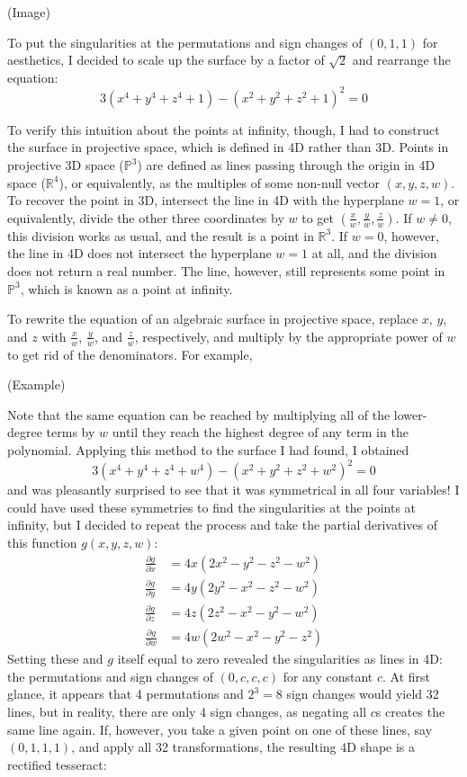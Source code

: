 \documentclass{article}
\begin{document}
(Image)

To put the singularities at the permutations and sign changes of $(0, 1, 1)$ for aesthetics,
I decided to scale up the surface by a factor of $\sqrt{2}$
and rearrange the equation:
$$3(x^4+y^4+z^4+1)-(x^2+y^2+z^2+1)^2=0$$

To verify this intuition about the points at infinity, though,
I had to construct the surface in projective space,
which is defined in 4D rather than 3D.
Points in projective 3D space ($\mathbb{P}^3$)
are defined as lines passing through the origin in 4D space ($\mathbb{R}^4$),
or equivalently, as the multiples of some non-null vector $(x, y, z, w)$.
To recover the point in 3D, intersect the line in 4D with the hyperplane $w=1$,
or equivalently, divide the other three coordinates by $w$
to get $\left(\frac{x}{w}, \frac{y}{w}, \frac{z}{w}\right)$.
If $w\neq0$, this division works as usual, and the result is a point in $\mathbb{R}^3$.
If $w=0$, however, the line in 4D does not intersect the hyperplane $w=1$ at all,
and the division does not return a real number.
The line, however, still represents some point in $\mathbb{P}^3$,
which is known as a point at infinity.

To rewrite the equation of an algebraic surface in projective space,
replace $x$, $y$, and $z$ with $\frac{x}{w}$, $\frac{y}{w}$, and $\frac{z}{w}$, respectively,
and multiply by the appropriate power of $w$ to get rid of the denominators.
For example,

(Example)

Note that the same equation can be reached by multiplying all of the lower-degree terms by $w$
until they reach the highest degree of any term in the polynomial.
Applying this method to the surface I had found, I obtained
$$3(x^4+y^4+z^4+w^4)-(x^2+y^2+z^2+w^2)^2=0$$
and was pleasantly surprised to see that it was symmetrical in all four variables!
I could have used these symmetries to find the singularities at the points at infinity,
but I decided to repeat the process
and take the partial derivatives of this function $g(x, y, z, w)$:
\begin{align*}
  \frac{\partial g}{\partial x} &= 4x(2x^2-y^2-z^2-w^2) \\ 
  \frac{\partial g}{\partial y} &= 4y(2y^2-x^2-z^2-w^2) \\ 
  \frac{\partial g}{\partial z} &= 4z(2z^2-x^2-y^2-w^2) \\ 
  \frac{\partial g}{\partial w} &= 4w(2w^2-x^2-y^2-z^2) 
\end{align*}
Setting these and $g$ itself equal to zero revealed the singularities as lines in 4D:
the permutations and sign changes of $(0, c, c, c)$ for any constant $c$.
At first glance, it appears that 4 permutations and $2^3=8$ sign changes would yield 32 lines,
but in reality, there are only 4 sign changes, as negating all $c$s creates the same line again.
If, however, you take a given point on one of these lines, say $(0, 1, 1, 1)$,
and apply all 32 transformations, the resulting 4D shape is a rectified tesseract:
\end{document}
